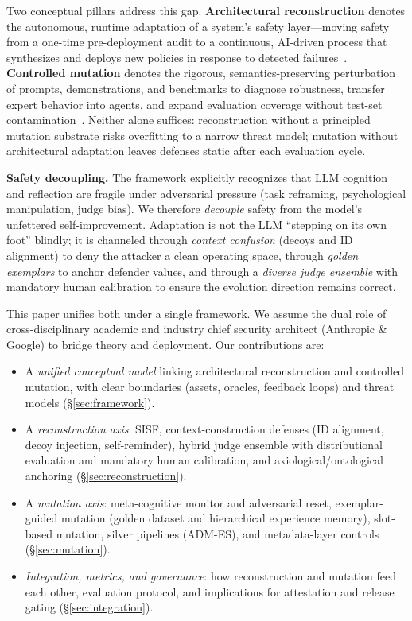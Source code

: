 \documentclass[letterpaper,twocolumn,10pt]{article}
\begin{document}
Two conceptual pillars address this gap. \textbf{Architectural reconstruction} denotes the autonomous, runtime adaptation of a system's safety layer---moving safety from a one-time pre-deployment audit to a continuous, AI-driven process that synthesizes and deploys new policies in response to detected failures~\cite{sisf-arxiv}. \textbf{Controlled mutation} denotes the rigorous, semantics-preserving perturbation of prompts, demonstrations, and benchmarks to diagnose robustness, transfer expert behavior into agents, and expand evaluation coverage without test-set contamination~\cite{reflective-mutation,adm-es-arxiv}. Neither alone suffices: reconstruction without a principled mutation substrate risks overfitting to a narrow threat model; mutation without architectural adaptation leaves defenses static after each evaluation cycle.

\textbf{Safety decoupling.} The framework explicitly recognizes that LLM cognition and reflection are fragile under adversarial pressure (task reframing, psychological manipulation, judge bias). We therefore \emph{decouple} safety from the model's unfettered self-improvement. Adaptation is not the LLM ``stepping on its own foot'' blindly; it is channeled through \emph{context confusion} (decoys and ID alignment) to deny the attacker a clean operating space, through \emph{golden exemplars} to anchor defender values, and through a \emph{diverse judge ensemble} with mandatory human calibration to ensure the evolution direction remains correct.

This paper unifies both under a single framework. We assume the dual role of cross-disciplinary academic and industry chief security architect (Anthropic \& Google) to bridge theory and deployment. Our contributions are:

\begin{itemize}
\item A \emph{unified conceptual model} linking architectural reconstruction and controlled mutation, with clear boundaries (assets, oracles, feedback loops) and threat models (\S\ref{sec:framework}).
\item A \emph{reconstruction axis}: SISF, context-construction defenses (ID alignment, decoy injection, self-reminder), hybrid judge ensemble with distributional evaluation and mandatory human calibration, and axiological/ontological anchoring (\S\ref{sec:reconstruction}).
\item A \emph{mutation axis}: meta-cognitive monitor and adversarial reset, exemplar-guided mutation (golden dataset and hierarchical experience memory), slot-based mutation, silver pipelines (ADM-ES), and metadata-layer controls (\S\ref{sec:mutation}).
\item \emph{Integration, metrics, and governance}: how reconstruction and mutation feed each other, evaluation protocol, and implications for attestation and release gating (\S\ref{sec:integration}).
\end{itemize}
\end{document}
